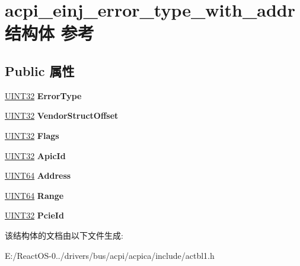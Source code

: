 \hypertarget{structacpi__einj__error__type__with__addr}{}\section{acpi\+\_\+einj\+\_\+error\+\_\+type\+\_\+with\+\_\+addr结构体 参考}
\label{structacpi__einj__error__type__with__addr}
\subsection*{Public 属性}
\begin{DoxyCompactItemize}
\item 
\mbox{\label{structacpi__einj__error__type__with__addr_a3908ca8364a2664f6412c6830378a7a4}} 
\hyperlink{_processor_bind_8h_ae1e6edbbc26d6fbc71a90190d0266018}{U\+I\+N\+T32} {\bfseries Error\+Type}
\item 
\mbox{\label{structacpi__einj__error__type__with__addr_a61a7fc369a0b8422641e2c0477b93c45}} 
\hyperlink{_processor_bind_8h_ae1e6edbbc26d6fbc71a90190d0266018}{U\+I\+N\+T32} {\bfseries Vendor\+Struct\+Offset}
\item 
\mbox{\label{structacpi__einj__error__type__with__addr_af0f9daf14c8f82fbd662b47e94923085}} 
\hyperlink{_processor_bind_8h_ae1e6edbbc26d6fbc71a90190d0266018}{U\+I\+N\+T32} {\bfseries Flags}
\item 
\mbox{\label{structacpi__einj__error__type__with__addr_a29c8d9f3076af540938c1ecc73543928}} 
\hyperlink{_processor_bind_8h_ae1e6edbbc26d6fbc71a90190d0266018}{U\+I\+N\+T32} {\bfseries Apic\+Id}
\item 
\mbox{\label{structacpi__einj__error__type__with__addr_a92e44fdb2010090ad70f2ecef5320c50}} 
\hyperlink{_processor_bind_8h_a57be03562867144161c1bfee95ca8f7c}{U\+I\+N\+T64} {\bfseries Address}
\item 
\mbox{\label{structacpi__einj__error__type__with__addr_adeef5ad7c5a0cce770d9536993ed7c33}} 
\hyperlink{_processor_bind_8h_a57be03562867144161c1bfee95ca8f7c}{U\+I\+N\+T64} {\bfseries Range}
\item 
\mbox{\label{structacpi__einj__error__type__with__addr_a58d76fe5ac21443611712190efc985d9}} 
\hyperlink{_processor_bind_8h_ae1e6edbbc26d6fbc71a90190d0266018}{U\+I\+N\+T32} {\bfseries Pcie\+Id}
\end{DoxyCompactItemize}


该结构体的文档由以下文件生成\+:\begin{DoxyCompactItemize}
\item 
E\+:/\+React\+O\+S-\/0../drivers/bus/acpi/acpica/include/actbl1.\+h\end{DoxyCompactItemize}

